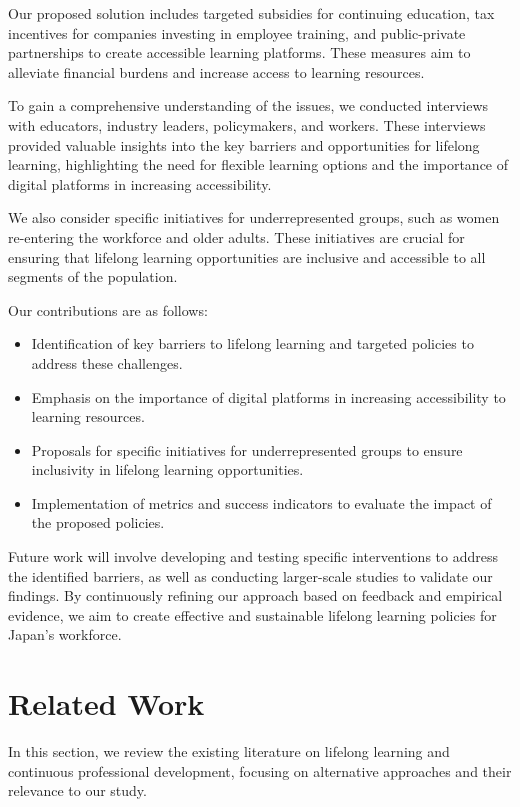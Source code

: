 \documentclass{article} %
\begin{document}
Our proposed solution includes targeted subsidies for continuing education, tax incentives for companies investing in employee training, and public-private partnerships to create accessible learning platforms. These measures aim to alleviate financial burdens and increase access to learning resources.

To gain a comprehensive understanding of the issues, we conducted interviews with educators, industry leaders, policymakers, and workers. These interviews provided valuable insights into the key barriers and opportunities for lifelong learning, highlighting the need for flexible learning options and the importance of digital platforms in increasing accessibility.

We also consider specific initiatives for underrepresented groups, such as women re-entering the workforce and older adults. These initiatives are crucial for ensuring that lifelong learning opportunities are inclusive and accessible to all segments of the population.

Our contributions are as follows:
\begin{itemize}
    \item Identification of key barriers to lifelong learning and targeted policies to address these challenges.
    \item Emphasis on the importance of digital platforms in increasing accessibility to learning resources.
    \item Proposals for specific initiatives for underrepresented groups to ensure inclusivity in lifelong learning opportunities.
    \item Implementation of metrics and success indicators to evaluate the impact of the proposed policies.
\end{itemize}

Future work will involve developing and testing specific interventions to address the identified barriers, as well as conducting larger-scale studies to validate our findings. By continuously refining our approach based on feedback and empirical evidence, we aim to create effective and sustainable lifelong learning policies for Japan's workforce.

\section{Related Work}
\label{sec:related}

In this section, we review the existing literature on lifelong learning and continuous professional development, focusing on alternative approaches and their relevance to our study.
\end{document}
